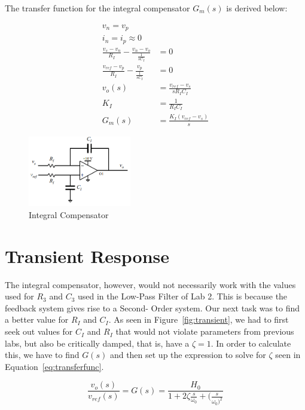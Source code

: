 \documentclass{hw}
\begin{document}
The transfer function for the integral compensator $G_m(s)$ is derived
below:

\begin{align*}
  v_n = v_p
  \\ i_n = i_p \approx 0
  \\ \frac{v_s-v_n}{R_I} - \frac{v_n-v_o}{\frac{1}{s C_I}} &= 0
  \\ \frac{v_{ref}-v_p}{R_I}-\frac{v_p}{\frac{1}{s C_I}}&=0
  \\ v_o(s) &= \frac{v_{ref}-v_s}{s R_I C_I}
  \\ K_I &= \frac{1}{R_I C_I}
  \\ G_m(s) &=\frac{K_I(v_{ref}-v_s)}{s}
\end{align*}

\begin{figure}[ht!]
  \centering
  \includegraphics[width=0.4\textwidth]{./img/integralcomp.png}
  \caption{Integral Compensator}
  \label{fig:integralcomp}
\end{figure}

\section{Transient Response}
The integral compensator, however, would not necessarily work with
the values used for $R_3$ and $C_3$ used in the Low-Pass Filter of 
Lab 2. This is because the feedback system gives rise to a Second-
Order system. Our next task was to find a better value for $R_I$
and $C_I$. 
As seen in Figure~\ref{fig:transient}, we had to first
seek out values for $C_I$ and $R_I$ that would not violate
parameters from previous labs, but also be critically damped, that
is, have a $\zeta=1$. In order to calculate this, we have to find
$G(s)$ and then set up the expression to solve for $\zeta$ seen in
Equation~\eqref{eq:transferfunc}.

\begin{equation}
  \frac{v_o(s)}{v_{ref}(s)}=G(s)=\frac{H_0}{1+2\zeta\frac{s}{\omega_0}+(\frac{s}{\omega_0)^2}}
  \label{eq:transferfunc}
\end{equation}
\end{document}
